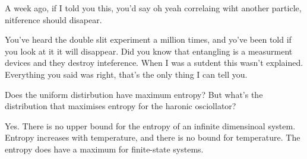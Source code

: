A week ago,
if I told you this,
you'd say oh yeah correlaing wiht another particle,
nitference should disapear.

You've heard the double slit experiment a million times,
and yo've been told if you look at it it will disappear.
Did you know that entangling is a measurment devices and they destroy
inteference.
When I was a sutdent this wasn't explained.
Everything you said was right,
that's the only thing I can tell you.

\begin{question}
    Does the uniform distirbution have maximum entropy?
    But what's the distribution that maximises entropy for the haronic
    osciollator?
\end{question}
Yes.
There is no upper bound for the entropy of an infinite dimensinoal system.
Entropy increases with temperature,
and there is no bound for temperature.
The entropy does have a maximum for finite-state systems.
